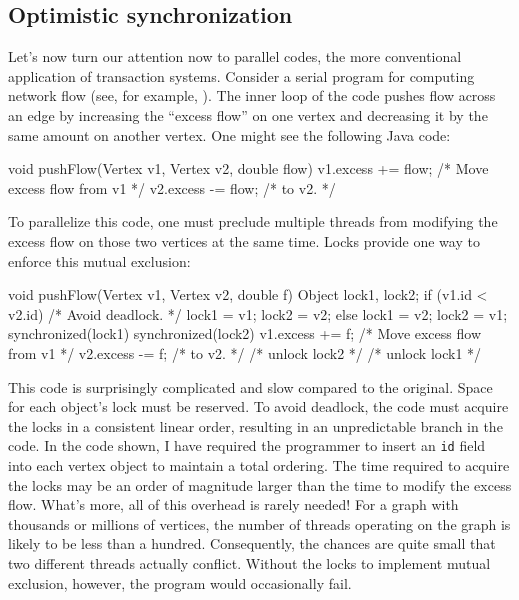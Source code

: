 \subsection{Optimistic synchronization}\label{sec:flow}

Let's now turn our attention now to parallel codes, the more
conventional application of transaction systems.
Consider a serial program for computing network flow (see, for
example, \cite[Chapter 26]{CormenLeRi01}).  The inner loop of the code
pushes flow across an edge by increasing the ``excess flow'' on one
vertex and decreasing it by the same amount on another vertex.  One
might see the following Java code:
\begin{inlinecode}
void pushFlow(Vertex v1, Vertex v2, double flow) {
  v1.excess += flow; /* Move excess flow from v1 */
  v2.excess -= flow; /* to v2.                   */
}
\end{inlinecode}

To parallelize this code, one must preclude multiple threads from
modifying the excess flow on those two vertices at the same time.
Locks provide one way to enforce this mutual exclusion: 
\begin{inlinecode}
void pushFlow(Vertex v1, Vertex v2, double f) {
  Object lock1, lock2;
  if (v1.id < v2.id) {       /* Avoid deadlock. */
    lock1 = v1; lock2 = v2;
  } else {
    lock1 = v2; lock2 = v1;
  }
  synchronized(lock1) {
    synchronized(lock2) {
      v1.excess += f; /* Move excess flow from v1 */
      v2.excess -= f; /* to v2.                   */
    } /* unlock lock2 */
  } /* unlock lock1 */
}
\end{inlinecode}

This code is surprisingly complicated and slow compared to the
original.  Space for each object's lock must be reserved.
To avoid deadlock, the code must acquire the locks in
a consistent linear order, resulting in an unpredictable branch in the
code.  In the code shown,
I have required the programmer to insert an \texttt{id} field into
each vertex object to maintain a total ordering.
The time required to acquire the locks may be
an order of magnitude larger than the time to
modify the excess flow.
What's more, all of this overhead is rarely
needed!  For a graph with thousands or millions of vertices, the
number of threads operating on the graph is likely to be less than a
hundred.  Consequently, the chances are quite small that two different
threads actually conflict.  Without the locks to implement mutual
exclusion, however, the program would occasionally fail.

